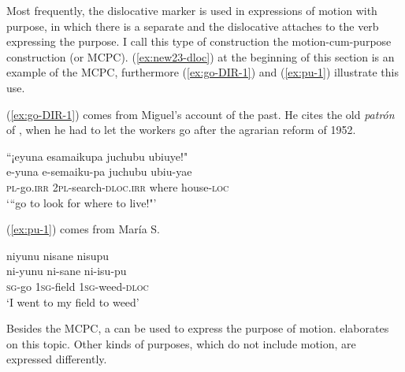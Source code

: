 Most frequently, the dislocative marker is used in expressions of motion with purpose, in which there is a separate  and the dislocative attaches to the verb expressing the purpose. I call this type of construction the motion-cum-purpose construction  (or MCPC). (\ref{ex:new23-dloc}) at the beginning of this section is an example of the MCPC, furthermore (\ref{ex:go-DIR-1}) and (\ref{ex:pu-1}) illustrate this use.

(\ref{ex:go-DIR-1}) comes from Miguel’s account of the past. He cites the old \textit{patrón} of , when he had to let the workers go after the agrarian reform of 1952.

\ea\label{ex:go-DIR-1}
\begingl 
\glpreamble “¡eyuna esamaikupa juchubu ubiuye!"\\
\gla e-yuna e-semaiku-pa juchubu ubiu-yae\\ 
\textsc{pl}-go.\textsc{irr} 2\textsc{pl}-search-\textsc{dloc.irr} where house-\textsc{loc}\\ 
\glft ‘“go to look for where to live!"’\\ 
\endgl
\trailingcitation{[mxx-p110825l.052]}
\xe

(\ref{ex:pu-1}) comes from María S.

\ea\label{ex:pu-1}
\begingl 
\glpreamble niyunu nisane nisupu\\
\gla ni-yunu ni-sane ni-isu-pu\\ 
\textsc{sg}-go 1\textsc{sg}-field 1\textsc{sg}-weed-\textsc{dloc}\\ 
\glft ‘I went to my field to weed’\\ 
\endgl
\trailingcitation{[rxx-e120511l.033]}
\xe


Besides the MCPC, a  can be used to express the purpose of motion.  elaborates on this topic. Other kinds of purposes, which do not include motion, are expressed differently.

